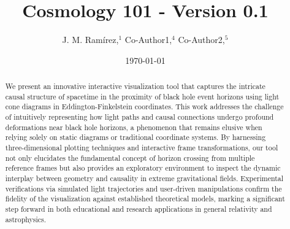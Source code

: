 \documentclass{article}
\title{Cosmology 101 - Version 0.1}
\author{J. M. Ram{\'i}rez,$^{1}$ Co-Author1,$^{4}$ Co-Author2,$^{5}$}
\date{\today}
\begin{document}
\maketitle\begin{abstract}
We present an innovative interactive visualization tool that captures the intricate causal structure of spacetime in the proximity of black hole event horizons using light cone diagrams in Eddington-Finkelstein coordinates. This work addresses the challenge of intuitively representing how light paths and causal connections undergo profound deformations near black hole horizons, a phenomenon that remains elusive when relying solely on static diagrams or traditional coordinate systems. By harnessing three-dimensional plotting techniques and interactive frame transformations, our tool not only elucidates the fundamental concept of horizon crossing from multiple reference frames but also provides an exploratory environment to inspect the dynamic interplay between geometry and causality in extreme gravitational fields. Experimental verifications via simulated light trajectories and user-driven manipulations confirm the fidelity of the visualization against established theoretical models, marking a significant step forward in both educational and research applications in general relativity and astrophysics.

\end{abstract}
\end{document}

